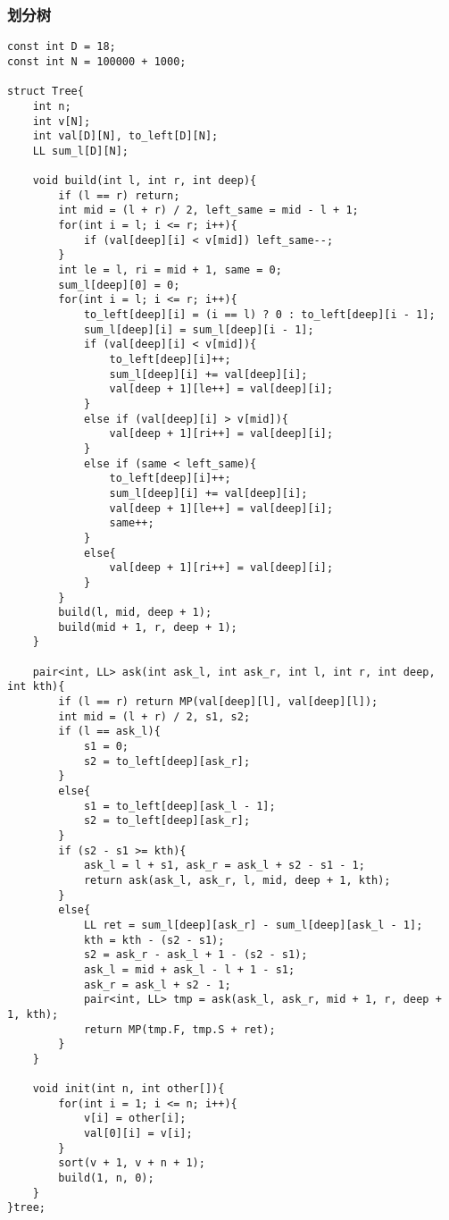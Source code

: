 \subsubsection{划分树}
\begin{verbatim}
const int D = 18;
const int N = 100000 + 1000;

struct Tree{
    int n;
    int v[N];
    int val[D][N], to_left[D][N];
    LL sum_l[D][N];

    void build(int l, int r, int deep){
        if (l == r) return;
        int mid = (l + r) / 2, left_same = mid - l + 1;
        for(int i = l; i <= r; i++){
            if (val[deep][i] < v[mid]) left_same--;
        }
        int le = l, ri = mid + 1, same = 0;
        sum_l[deep][0] = 0;
        for(int i = l; i <= r; i++){
            to_left[deep][i] = (i == l) ? 0 : to_left[deep][i - 1];
            sum_l[deep][i] = sum_l[deep][i - 1];
            if (val[deep][i] < v[mid]){
                to_left[deep][i]++;
                sum_l[deep][i] += val[deep][i];
                val[deep + 1][le++] = val[deep][i];
            }
            else if (val[deep][i] > v[mid]){
                val[deep + 1][ri++] = val[deep][i];
            }
            else if (same < left_same){
                to_left[deep][i]++;
                sum_l[deep][i] += val[deep][i];
                val[deep + 1][le++] = val[deep][i];
                same++;
            }
            else{
                val[deep + 1][ri++] = val[deep][i];
            }
        }
        build(l, mid, deep + 1);
        build(mid + 1, r, deep + 1);
    }

    pair<int, LL> ask(int ask_l, int ask_r, int l, int r, int deep, int kth){ 
        if (l == r) return MP(val[deep][l], val[deep][l]);
        int mid = (l + r) / 2, s1, s2;
        if (l == ask_l){
            s1 = 0;
            s2 = to_left[deep][ask_r];
        }
        else{
            s1 = to_left[deep][ask_l - 1];
            s2 = to_left[deep][ask_r];
        }
        if (s2 - s1 >= kth){
            ask_l = l + s1, ask_r = ask_l + s2 - s1 - 1;
            return ask(ask_l, ask_r, l, mid, deep + 1, kth);
        }
        else{
            LL ret = sum_l[deep][ask_r] - sum_l[deep][ask_l - 1];
            kth = kth - (s2 - s1);
            s2 = ask_r - ask_l + 1 - (s2 - s1);
            ask_l = mid + ask_l - l + 1 - s1;
            ask_r = ask_l + s2 - 1;
            pair<int, LL> tmp = ask(ask_l, ask_r, mid + 1, r, deep + 1, kth);
            return MP(tmp.F, tmp.S + ret);
        }
    }

    void init(int n, int other[]){
        for(int i = 1; i <= n; i++){
            v[i] = other[i];
            val[0][i] = v[i];
        }
        sort(v + 1, v + n + 1);
        build(1, n, 0);
    }
}tree;
\end{verbatim}

